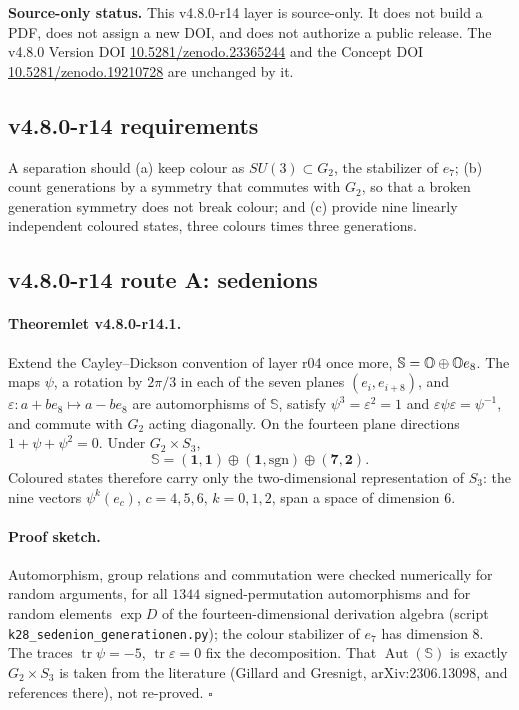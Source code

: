 \noindent\textbf{Source-only status.}
This v4.8.0-r14 layer is source-only.  It does not build a PDF, does not assign a new DOI,
and does not authorize a public release.  The v4.8.0 Version DOI
\href{https://doi.org/10.5281/zenodo.23365244}{10.5281/zenodo.23365244} and the Concept DOI
\href{https://doi.org/10.5281/zenodo.19210728}{10.5281/zenodo.19210728} are unchanged by it.

\subsection*{v4.8.0-r14 requirements}
\label{subsec:v480-r14-requirements}

A separation should (a) keep colour as \(SU(3)\subset G_2\), the stabilizer of \(e_7\); (b) count generations by a
symmetry that commutes with \(G_2\), so that a broken generation symmetry does not break colour; and (c) provide
nine linearly independent coloured states, three colours times three generations.

\subsection*{v4.8.0-r14 route A: sedenions}
\label{subsec:v480-r14-sedenions}

\paragraph{Theoremlet v4.8.0-r14.1.}
Extend the Cayley--Dickson convention of layer r04 once more, \(\mathbb S=\mathbb{O}\oplus\mathbb{O} e_8\).  The maps
\(\psi\), a rotation by \(2\pi/3\) in each of the seven planes \((e_i,e_{i+8})\), and \(\varepsilon\colon
a+be_8\mapsto a-be_8\) are automorphisms of \(\mathbb S\), satisfy \(\psi^3=\varepsilon^2=1\) and
\(\varepsilon\psi\varepsilon=\psi^{-1}\), and commute with \(G_2\) acting diagonally.  On the fourteen plane
directions \(1+\psi+\psi^2=0\).  Under \(G_2\times S_3\),
\[
\mathbb S=(\mathbf1,\mathbf1)\oplus(\mathbf1,\mathrm{sgn})\oplus(\mathbf7,\mathbf2).
\]
Coloured states therefore carry only the two-dimensional representation of \(S_3\): the nine vectors
\(\psi^k(e_c)\), \(c=4,5,6\), \(k=0,1,2\), span a space of dimension \(6\).

\paragraph{Proof sketch.}
Automorphism, group relations and commutation were checked numerically for random arguments, for all \(1344\)
signed-permutation automorphisms and for random elements \(\exp D\) of the fourteen-dimensional derivation
algebra (script \texttt{k28\_sedenion\_generationen.py}); the colour stabilizer of \(e_7\) has dimension \(8\).
The traces \(\operatorname{tr}\psi=-5\), \(\operatorname{tr}\varepsilon=0\) fix the decomposition.  That
\(\operatorname{Aut}(\mathbb S)\) is exactly \(G_2\times S_3\) is taken from the literature (Gillard and
Gresnigt, arXiv:2306.13098, and references there), not re-proved.  \(\square\)

